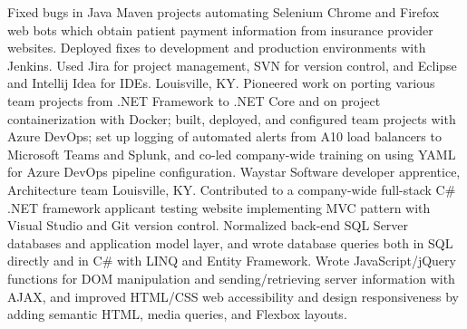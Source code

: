 {Fixed bugs in Java Maven projects automating Selenium Chrome and Firefox web bots which obtain patient payment information from insurance provider websites. Deployed fixes to development and production environments with Jenkins. Used Jira for project management, SVN for version control, and Eclipse and Intellij Idea for IDEs.
}
{Louisville, KY. Pioneered work on porting various team projects from .NET Framework to .NET Core and on project containerization with Docker; built, deployed, and configured team projects with Azure DevOps; set up logging of automated alerts from A10 load balancers to Microsoft Teams and Splunk, and co-led company-wide training on using YAML for Azure DevOps pipeline configuration.
}
{Waystar}
{Software developer apprentice, Architecture team}
{Louisville, KY. Contributed to a company-wide full-stack C\# .NET framework applicant testing website implementing MVC pattern with Visual Studio and Git version control. Normalized back-end SQL Server databases and application model layer, and wrote database queries both in SQL directly and in C\# with LINQ and Entity Framework. Wrote JavaScript/jQuery functions for DOM manipulation and sending/retrieving server information with AJAX, and improved HTML/CSS web accessibility and design responsiveness by adding semantic HTML, media queries, and Flexbox layouts. }
